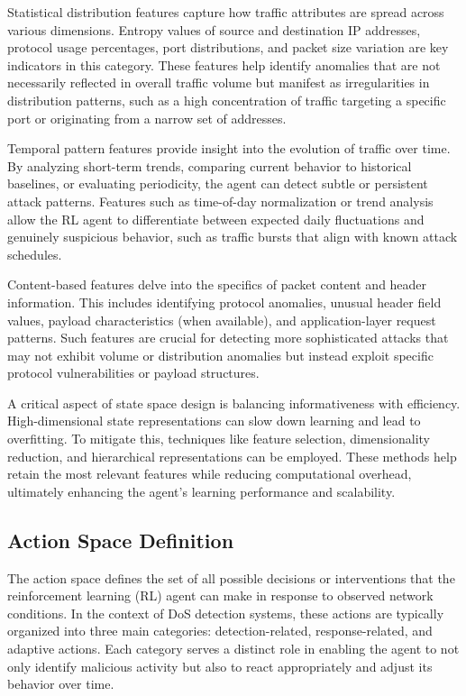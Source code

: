 \documentclass[16pt]{report}
\begin{document}
Statistical distribution features capture how traffic attributes are spread across various dimensions. Entropy values of source and destination IP addresses, protocol usage percentages, port distributions, and packet size variation are key indicators in this category. These features help identify anomalies that are not necessarily reflected in overall traffic volume but manifest as irregularities in distribution patterns, such as a high concentration of traffic targeting a specific port or originating from a narrow set of addresses.

Temporal pattern features provide insight into the evolution of traffic over time. By analyzing short-term trends, comparing current behavior to historical baselines, or evaluating periodicity, the agent can detect subtle or persistent attack patterns. Features such as time-of-day normalization or trend analysis allow the RL agent to differentiate between expected daily fluctuations and genuinely suspicious behavior, such as traffic bursts that align with known attack schedules.

Content-based features delve into the specifics of packet content and header information. This includes identifying protocol anomalies, unusual header field values, payload characteristics (when available), and application-layer request patterns. Such features are crucial for detecting more sophisticated attacks that may not exhibit volume or distribution anomalies but instead exploit specific protocol vulnerabilities or payload structures.

A critical aspect of state space design is balancing informativeness with efficiency. High-dimensional state representations can slow down learning and lead to overfitting. To mitigate this, techniques like feature selection, dimensionality reduction, and hierarchical representations can be employed. These methods help retain the most relevant features while reducing computational overhead, ultimately enhancing the agent’s learning performance and scalability.

\subsection{Action Space Definition}

The action space defines the set of all possible decisions or interventions that the reinforcement learning (RL) agent can make in response to observed network conditions. In the context of DoS detection systems, these actions are typically organized into three main categories: detection-related, response-related, and adaptive actions. Each category serves a distinct role in enabling the agent to not only identify malicious activity but also to react appropriately and adjust its behavior over time.
\end{document}
